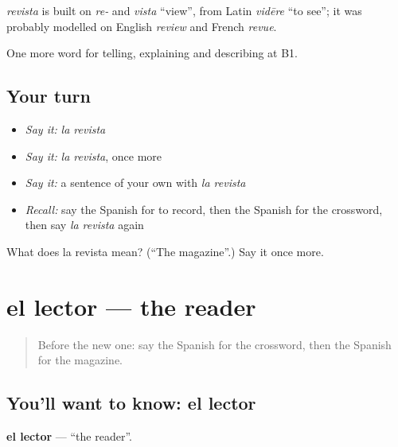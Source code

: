 \begin{cousinweb}
\emph{revista} is built on \emph{re-} and \emph{vista} \textquotedblleft{}view\textquotedblright{}, from Latin \emph{vidēre} \textquotedblleft{}to see\textquotedblright{}; it was probably modelled on English \emph{review} and French \emph{revue}.
\end{cousinweb}

\begin{grammarlens}[title={What you've built}]
One more word for telling, explaining and describing at B1.
\end{grammarlens}

\subsection*{Your turn}
\begin{itemize}
\raggedright
  \item \emph{Say it:} \emph{la revista}
  \item \emph{Say it:} \emph{la revista}, once more
  \item \emph{Say it:} a sentence of your own with \emph{la revista}
  \item \emph{Recall:} say the Spanish for to record, then the Spanish for the crossword, then say \emph{la revista} again
\end{itemize}

\begin{tcolorbox}[breakable,colback=teal!4,colframe=teal!35!black,title={Before you move on}]
What does la revista mean? (\textquotedblleft{}The magazine\textquotedblright{}.) Say it once more.
\end{tcolorbox}
\section[el lector]{el lector — the reader}

\label{lesson:ES-C762-lector}



\begin{quote}
Before the new one: say the Spanish for the crossword, then the Spanish for the magazine.
\end{quote}

\subsection*{You'll want to know: el lector}
\textbf{el lector} — \textquotedblleft{}the reader\textquotedblright{}.

